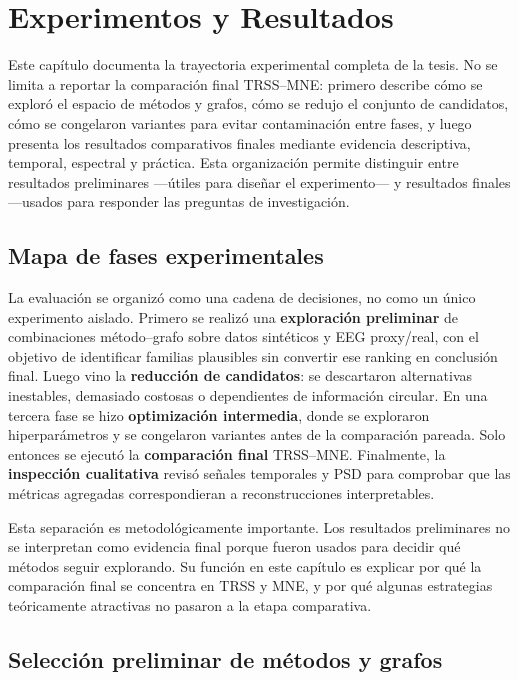 \chapter{Experimentos y Resultados}
\label{ch:resultados}

Este capítulo documenta la trayectoria experimental completa de la tesis. No se limita a reportar la comparación final TRSS--MNE: primero describe cómo se exploró el espacio de métodos y grafos, cómo se redujo el conjunto de candidatos, cómo se congelaron variantes para evitar contaminación entre fases, y luego presenta los resultados comparativos finales mediante evidencia descriptiva, temporal, espectral y práctica. Esta organización permite distinguir entre resultados preliminares —útiles para diseñar el experimento— y resultados finales —usados para responder las preguntas de investigación.

\section{Mapa de fases experimentales}

La evaluación se organizó como una cadena de decisiones, no como un único experimento aislado. Primero se realizó una \textbf{exploración preliminar} de combinaciones método--grafo sobre datos sintéticos y EEG proxy/real, con el objetivo de identificar familias plausibles sin convertir ese ranking en conclusión final. Luego vino la \textbf{reducción de candidatos}: se descartaron alternativas inestables, demasiado costosas o dependientes de información circular. En una tercera fase se hizo \textbf{optimización intermedia}, donde se exploraron hiperparámetros y se congelaron variantes antes de la comparación pareada. Solo entonces se ejecutó la \textbf{comparación final} TRSS--MNE. Finalmente, la \textbf{inspección cualitativa} revisó señales temporales y PSD para comprobar que las métricas agregadas correspondieran a reconstrucciones interpretables.

Esta separación es metodológicamente importante. Los resultados preliminares no se interpretan como evidencia final porque fueron usados para decidir qué métodos seguir explorando. Su función en este capítulo es explicar por qué la comparación final se concentra en TRSS y MNE, y por qué algunas estrategias teóricamente atractivas no pasaron a la etapa comparativa.

\section{Selección preliminar de métodos y grafos}

